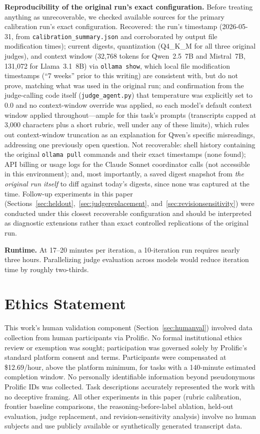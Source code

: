 \documentclass[11pt]{article}
\begin{document}
\textbf{Reproducibility of the original run's exact configuration.} Before
treating anything as unrecoverable, we checked available sources for the
primary calibration run's exact configuration. Recovered: the run's
timestamp (2026-05-31, from \texttt{calibration\_summary.json} and
corroborated by output file modification times); current digests,
quantization (Q4\_K\_M for all three original judges), and context window
(32{,}768 tokens for Qwen~2.5~7B and Mistral~7B, 131{,}072 for
Llama~3.1~8B) via \texttt{ollama show}, which local file modification
timestamps (``7 weeks'' prior to this writing) are consistent with, but do
not prove, matching what was used in the original run; and confirmation
from the judge-calling code itself (\texttt{judge\_agent.py}) that
temperature was explicitly set to 0.0 and no context-window override was
applied, so each model's default context window applied throughout---ample
for this task's prompts (transcripts capped at 3{,}000 characters plus a
short rubric, well under any of these limits), which rules out
context-window truncation as an explanation for Qwen's specific
misreadings, addressing one previously open question. Not recoverable:
shell history containing the original \texttt{ollama pull} commands and
their exact timestamps (none found); API billing or usage logs for the
Claude Sonnet coordinator calls (not accessible in this environment); and,
most importantly, a saved digest snapshot from \emph{the original run
itself} to diff against today's digests, since none was captured at the
time. Follow-up experiments in this paper (Sections~\ref{sec:heldout},~\ref{sec:judgereplacement},
and~\ref{sec:revisionsensitivity}) were conducted under this closest
recoverable configuration and should be interpreted as diagnostic
extensions rather than exact controlled replications of the original run.

\textbf{Runtime.} At 17--20 minutes per iteration, a 10-iteration run requires
nearly three hours. Parallelizing judge evaluation across models would reduce
iteration time by roughly two-thirds.

\section{Ethics Statement}

This work's human validation component (Section~\ref{sec:humanval})
involved data collection from human participants via Prolific. No formal
institutional ethics review or exemption was sought; participation was
governed solely by Prolific's standard platform consent and terms.
Participants were compensated at \$12.69/hour, above the platform minimum,
for tasks with a 140-minute estimated completion window. No personally
identifiable information beyond pseudonymous Prolific IDs was collected.
Task descriptions accurately represented the work with no deceptive
framing. All other experiments in this paper (rubric calibration, frontier
baseline comparisons, the reasoning-before-label ablation, held-out
evaluation, judge replacement, and revision-sensitivity analysis) involve
no human subjects and use publicly available or synthetically generated
transcript data.
\end{document}
